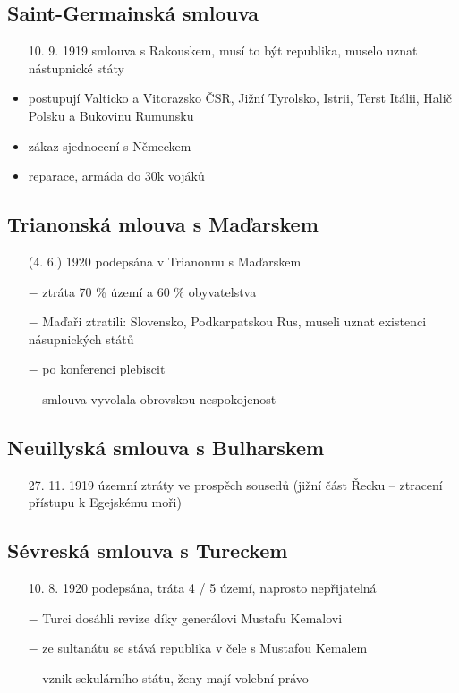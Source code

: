 \documentclass{article}
\begin{document}
\subsection*{Saint-Germainská smlouva }
\begin{itemize}
  \item[10. 9. 1919] smlouva s Rakouskem, musí to být republika, muselo uznat nástupnické státy
  \item postupují Valticko a Vitorazsko ČSR, Jižní Tyrolsko, Istrii, Terst Itálii, Halič Polsku a Bukovinu Rumunsku
  \item zákaz sjednocení s Německem
  \item reparace, armáda do 30k vojáků
\end{itemize}

\subsection*{Trianonská mlouva s Maďarskem}
\begin{itemize}
    \vspace{-0.5em}
    \setlength\itemsep{0.15em}
    \item[(4. 6.) 1920] podepsána v Trianonnu s Maďarskem
    \item[$-$] ztráta 70 \% území a 60 \% obyvatelstva
    \item[$-$] Maďaři ztratili: Slovensko, Podkarpatskou Rus, museli uznat existenci násupnických států
    \item[$-$] po konferenci plebiscit
    \item[$-$] smlouva vyvolala obrovskou nespokojenost
\end{itemize}

\subsection*{Neuillyská smlouva s Bulharskem}
\begin{itemize}
    \vspace{-0.5em}
    \setlength\itemsep{0.15em}
    \item[27. 11. 1919] územní ztráty ve prospěch sousedů (jižní část Řecku -- ztracení přístupu k Egejskému moři)
\end{itemize}

\subsection*{Sévreská smlouva s Tureckem}
\begin{itemize}
    \vspace{-0.5em}
    \setlength\itemsep{0.15em}
    \item[10. 8. 1920] podepsána, tráta 4 / 5 území, naprosto nepřijatelná
    \item[$-$] Turci dosáhli revize díky generálovi Mustafu Kemalovi
    \item[$-$] ze sultanátu se stává republika v čele s Mustafou Kemalem
    \item[$-$] vznik sekulárního státu, ženy mají volební právo
\end{itemize}
\end{document}
